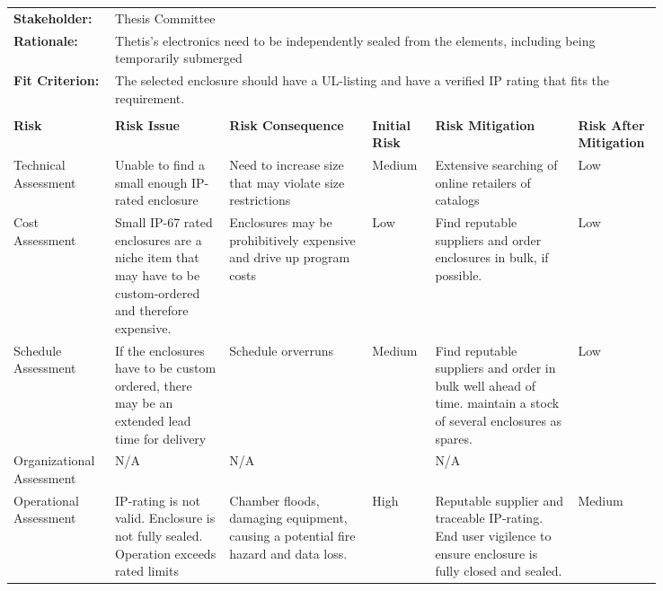 \begin{landscape}
{\begin{longtable}{| p{0.12\linewidth} | p{0.16\linewidth} |  p{0.20\linewidth} | p{0.08\linewidth} | p{0.20\linewidth} | p{0.08\linewidth} |}
	\hline
	\rowcolor[gray]{0.8}
	\multicolumn{6}{|c|}{ } \\
	\hline
	\textbf{Stakeholder:} & \multicolumn{5}{|l|}{Thesis Committee} \\
	\hline
	\textbf{Rationale:} & \multicolumn{5}{|p{0.8\linewidth}|}{Thetis's electronics need to be independently sealed from the elements, including being temporarily submerged } \\
	\hline
	\textbf{Fit Criterion:} & \multicolumn{5}{|p{0.8\linewidth}|}{The selected enclosure should have a UL-listing and have a verified IP rating that fits the requirement.} \\
	\hline
	\rowcolor[gray]{0.8}
	\multicolumn{6}{|c|}{ } \\
	\hline
	\textbf{Risk} & \textbf{Risk Issue} & \textbf{Risk Consequence} & \textbf{Initial Risk} & \textbf{Risk Mitigation} & \textbf{Risk \newline After \newline Mitigation} \\
	\hline
	Technical \newline Assessment & Unable to find a small enough IP-rated enclosure & Need to increase size that may violate size restrictions & \cellcolor{yellow} Medium & Extensive searching of online retailers of catalogs & \cellcolor{green} Low \\
	\hline
	Cost \newline Assessment & Small IP-67 rated enclosures are a niche item that may have to be custom-ordered and therefore expensive. & Enclosures may be prohibitively expensive and drive up program costs & \cellcolor{green} Low & Find reputable suppliers and order enclosures in bulk, if possible. & \cellcolor{green} Low \\
	\hline
	Schedule \newline Assessment & If the enclosures have to be custom ordered, there may be an extended lead time for delivery & Schedule orverruns & \cellcolor{yellow} Medium & Find reputable suppliers and order in bulk well ahead of time. \newline maintain a stock of several enclosures as spares. & \cellcolor{green} Low \\
	\hline
	Organizational \newline Assessment & N/A & N/A & \cellcolor[gray]{0.8} & N/A & \cellcolor[gray]{0.8} \\
	\hline
	Operational \newline Assessment & IP-rating is not valid. \newline Enclosure is not fully sealed. \newline Operation exceeds rated limits & Chamber floods, damaging equipment, causing a potential fire hazard and data loss. & \cellcolor{red} High & Reputable supplier and traceable IP-rating. \newline End user vigilence to ensure enclosure is fully closed and sealed. & \cellcolor{yellow} Medium
	\label{tab:sr02_feasibility}
\end{longtable}
}
\newpage


\end{landscape}
